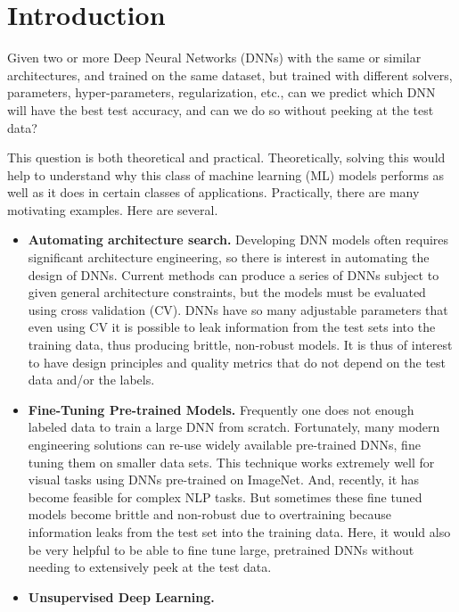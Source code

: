 
\section{Introduction}
\label{sxn:intro}

Given two or more Deep Neural Networks (DNNs) with the same or similar architectures, and trained on the same dataset, but trained with different solvers, parameters, hyper-parameters, regularization, etc., can we predict which DNN will have the best test accuracy, and can we do so without peeking at the test data?   

This question is both theoretical and practical. 
Theoretically, solving this would help to understand why this class of machine learning (ML) models performs as well as it does in certain classes of applications.
Practically, there are many motivating examples.
% 
Here are several.
\begin{itemize}
\item
\textbf{Automating architecture search.}
Developing DNN models often requires significant architecture engineering, so there is interest in automating the design of DNNs.
Current methods can produce a series of DNNs subject to given general architecture constraints, but the models must be evaluated using cross validation (CV).
DNNs have so many adjustable parameters  that even using CV it is possible to leak information from the test sets into the training data, thus producing brittle, non-robust models.
It is thus of interest to have design principles and quality metrics that do not depend on the test data and/or the labels.  
\item
\textbf{Fine-Tuning Pre-trained Models.}
Frequently one does not enough labeled data to train a large DNN from scratch.
Fortunately, many modern engineering solutions can re-use widely available pre-trained DNNs, fine tuning them on smaller data sets. 
This technique works extremely well for visual tasks using DNNs pre-trained on ImageNet. 
And, recently, it has become feasible for complex NLP tasks.  
But sometimes these fine tuned models become brittle and non-robust due to overtraining because information leaks from the test set into the training data.
Here, it would also be very helpful to be able to fine tune large, pretrained DNNs without needing to extensively peek at the test data.
\item
\textbf{Unsupervised Deep Learning.}
\end{itemize}

